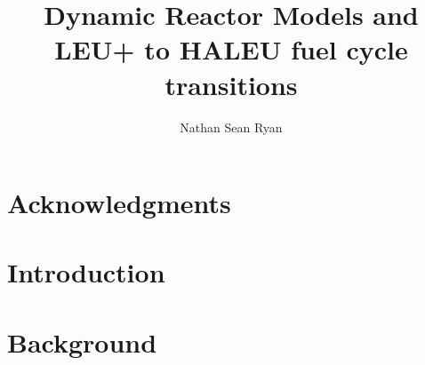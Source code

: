 \documentclass[edeposit,fullpage]{uiucthesis2018}
\title{Dynamic Reactor Models and LEU+ to HALEU fuel cycle transitions}
\author{Nathan Sean Ryan}
\begin{document}
\maketitle

\frontmatter
\begin{abstract}



\end{abstract}

\chapter*{Acknowledgments}




\tableofcontents
\listoftables
\listoffigures


\pagebreak
\mainmatter

\chapter{Introduction}
\label{ch:introduction}
\glsresetall




\chapter{Background}
\label{ch:background}
\glsresetall
\end{document}
